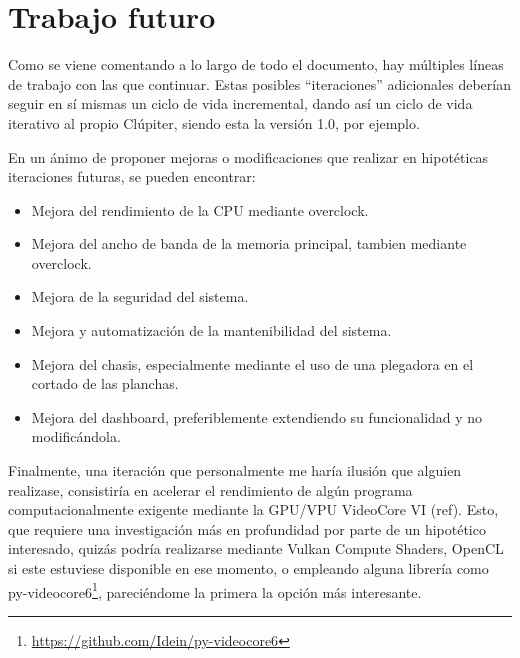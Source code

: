 \section{Trabajo futuro}
Como se viene comentando a lo largo de todo el documento, hay múltiples líneas de trabajo con las que continuar. Estas posibles ``iteraciones'' adicionales deberían seguir en sí mismas un ciclo de vida incremental, dando así un ciclo de vida iterativo al propio Clúpiter, siendo esta la versión 1.0, por ejemplo.

En un ánimo de proponer mejoras o modificaciones que realizar en hipotéticas iteraciones futuras, se pueden encontrar:
\begin{itemize}
    \item Mejora del rendimiento de la CPU mediante \gls{overclock}.
    \item Mejora del ancho de banda de la memoria principal, tambien mediante \gls{overclock}.
    \item Mejora de la seguridad del sistema.
    \item Mejora y automatización de la mantenibilidad del sistema.
    \item Mejora del chasis, especialmente mediante el uso de una plegadora en el cortado de las planchas.
    \item Mejora del dashboard, preferiblemente extendiendo su funcionalidad y no modificándola.
\end{itemize}

Finalmente, una iteración que personalmente me haría ilusión que alguien realizase, consistiría en acelerar el rendimiento de algún programa computacionalmente exigente mediante la GPU/VPU VideoCore VI (ref). Esto, que requiere una investigación más en profundidad por parte de un hipotético interesado, quizás podría realizarse mediante Vulkan Compute Shaders, OpenCL si este estuviese disponible en ese momento, o empleando alguna librería como py-videocore6\footnote{\url{https://github.com/Idein/py-videocore6}}, pareciéndome la primera la opción más interesante.